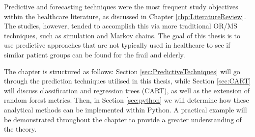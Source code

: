 \documentclass[../thesis.tex]{subfiles}
\begin{document}

Predictive and forecasting techniques were the most frequent study objectives within the healthcare literature, as discussed in Chapter \ref{chp:LiteratureReview}. The studies, however, tended to accomplish this via more traditional OR/MS techniques, such as simulation and Markov chains. The goal of this thesis is to use predictive approaches that are not typically used in healthcare to see if similar patient groups can be found for the frail and elderly.

The chapter is structured as follows: Section \ref{sec:PredictiveTechniques} will go through the prediction techniques utilised in this thesis, while Section \ref{sec:CART} will discuss classification and regression trees (CART), as well as the extension of random forest metrics. Then, in Section \ref{sec:python} we will determine how these analytical methods can be implemented within Python. A practical example will be demonstrated throughout the chapter to provide a greater understanding of the theory.
\end{document}
